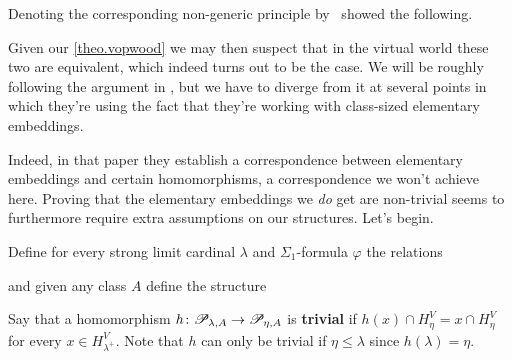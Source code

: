 \documentclass[../../main]{subfiles}
\begin{document}
Denoting the corresponding non-generic principle by \wvp\, \cite{WilsonWVP} showed the following.


Given our \ref{theo.vopwood} we may then suspect that in the virtual world these two are equivalent, which indeed turns out to be the case. We will be roughly following the argument in \cite{WilsonWVP}, but we have to diverge from it at several points in which they're using the fact that they're working with class-sized elementary embeddings. 

\qquad Indeed, in that paper they establish a correspondence between elementary embeddings and certain homomorphisms, a correspondence we won't achieve here. Proving that the elementary embeddings we \textit{do} get are non-trivial seems to furthermore require extra assumptions on our structures. Let's begin.

\qquad Define for every strong limit cardinal $\lambda$ and $\Sigma_1$-formula $\varphi$ the relations

and given any class $A$ define the structure

Say that a homomorphism $h\colon\mathscr P_{\lambda,A}\to\mathscr P_{\eta,A}$ is \textbf{trivial} if $h(x)\cap H_\eta^V = x\cap H_\eta^V$ for every $x\in H_{\lambda^+}^V$. Note that $h$ can only be trivial if $\eta\leq\lambda$ since $h(\lambda)=\eta$.
\end{document}
